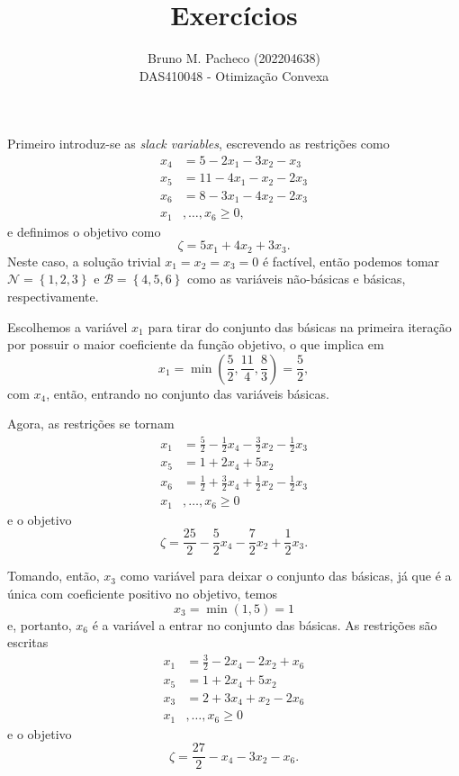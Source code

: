 \documentclass[a4paper]{report}
\begin{document}
 
\title{Exercícios}
\author{Bruno M. Pacheco (202204638) \\
DAS410048 - Otimização Convexa}
 
\maketitle
 


Primeiro introduz-se as \emph{slack variables}, escrevendo as restrições como
\begin{align*}
    x_4 &= 5 - 2x_1 - 3x_2 - x_3 \\
    x_5 &= 11 - 4x_1 - x_2 - 2x_3  \\
    x_6 &= 8 - 3x_1 - 4x_2 - 2x_3  \\
    x_1&,\ldots,x_6 \ge 0
,\end{align*}
e definimos o objetivo como \[
\zeta = 5x_1 + 4x_2 + 3x_3
.\] 
Neste caso, a solução trivial $x_1=x_2=x_3=0$ é factível, então podemos tomar $\mathcal{N}=\left\{ 1,2,3 \right\} $ e $\mathcal{B} = \left\{ 4,5,6 \right\} $ como as variáveis não-básicas e básicas, respectivamente.

Escolhemos a variável $x_1$ para tirar do conjunto das básicas na primeira iteração por possuir o maior coeficiente da função objetivo, o que implica em \[
x_1 = \min \left( \frac{5}{2},\frac{11}{4},\frac{8}{3} \right) = \frac{5}{2}
,\] com $x_4$, então, entrando no conjunto das variáveis básicas.

Agora, as restrições se tornam
\begin{align*}
    x_1 &= \frac{5}{2} - \frac{1}{2}x_4 -\frac{3}{2}x_2 -\frac{1}{2}x_3 \\
    x_5 &= 1 + 2x_4 +5x_2 \\
    x_6 &= \frac{1}{2} + \frac{3}{2}x_4 + \frac{1}{2}x_2 - \frac{1}{2}x_3 \\
    x_1&,\ldots,x_6 \ge 0
\end{align*}
e o objetivo \[
\zeta = \frac{25}{2} -\frac{5}{2}x_4 -\frac{7}{2}x_2 + \frac{1}{2}x_3
.\] 

Tomando, então, $x_3$ como variável para deixar o conjunto das básicas, já que é a única com coeficiente positivo no objetivo, temos \[
x_3 = \min\left( 1,5 \right) = 1
\] e, portanto, $x_6$ é a variável a entrar no conjunto das básicas.
As restrições são escritas
\begin{align*}
    x_1 &= \frac{3}{2} - 2x_4 - 2x_2 +x_6 \\
    x_5 &= 1 + 2x_4 +5x_2 \\
    x_3 &= 2 + 3x_4 + x_2 - 2x_6 \\
    x_1&,\ldots,x_6 \ge 0
\end{align*}
e o objetivo \[
\zeta = \frac{27}{2} -x_4 -3x_2 - x_6
.\] 
\end{document}
